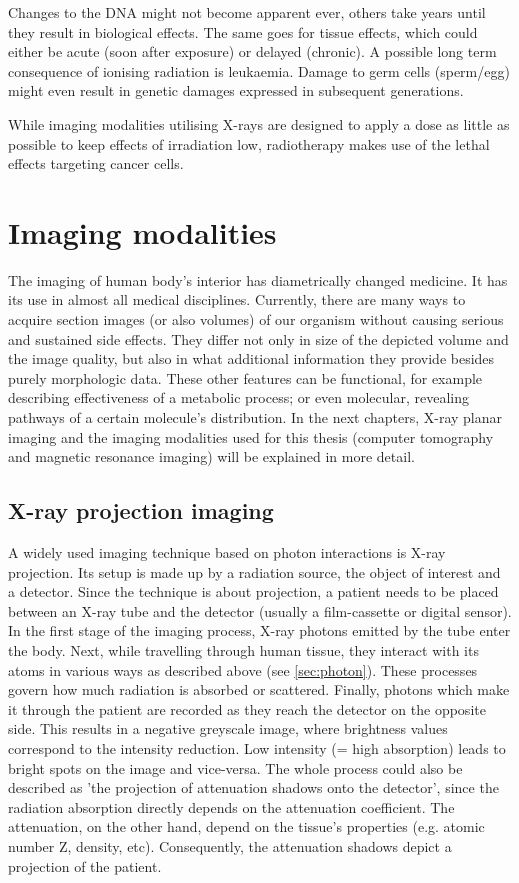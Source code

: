 Changes to the DNA might not become apparent ever, others take years until they result in biological effects.
The same goes for tissue effects, which could either be acute (soon after exposure) or delayed (chronic).
A possible long term consequence of ionising radiation is leukaemia.
Damage to germ cells (sperm/egg) might even result in genetic damages expressed in subsequent generations.


While imaging modalities utilising X-rays are designed to apply a dose as little as possible to keep effects of irradiation low, radiotherapy makes use of the lethal effects targeting cancer cells. \cite{Podgorsak, Maidment2014}

\section{Imaging modalities}

The imaging of human body's interior has diametrically changed medicine.
It has its use in almost all medical disciplines.
Currently, there are many ways to acquire section images (or also volumes) of our organism without causing serious and sustained side effects.
They differ not only in size of the depicted volume and the image quality, but also in what additional information they provide besides purely morphologic data.
These other features can be functional, for example describing effectiveness of a metabolic process; or even molecular, revealing pathways of a certain molecule's distribution.
In the next chapters, X-ray planar imaging and the imaging modalities used for this thesis (computer tomography and magnetic resonance imaging) will be explained in more detail.


\subsection{X-ray projection imaging}
A widely used imaging technique based on photon interactions is X-ray projection.
Its setup is made up by a radiation source, the object of interest and a detector.
Since the technique is about projection, a patient needs to be placed between an X-ray tube and the detector (usually a film-cassette or digital sensor).
In the first stage of the imaging process, X-ray photons emitted by the tube enter the body.
Next, while travelling through human tissue, they interact with its atoms in various ways as described above (see \ref{sec:photon}).
These processes govern how much radiation is absorbed or scattered.
Finally, photons which make it through the patient are recorded as they reach the detector on the opposite side.
This results in a negative greyscale image, where brightness values correspond to the intensity reduction.
Low intensity (= high absorption) leads to bright spots on the image and vice-versa.
The whole process could also be described as 'the projection of attenuation shadows onto the detector', since the radiation absorption directly depends on the attenuation coefficient. The attenuation, on the other hand, depend on the tissue's properties (e.g. atomic number Z, density, etc).
Consequently, the attenuation shadows depict a projection of the patient.

